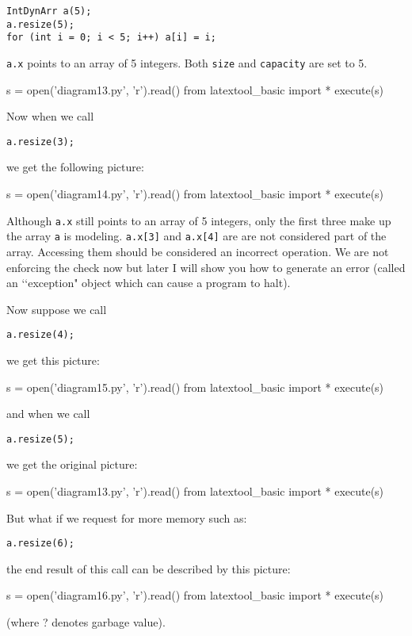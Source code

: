 \begin{Verbatim}[frame=single]
IntDynArr a(5);
a.resize(5);
for (int i = 0; i < 5; i++) a[i] = i;
\end{Verbatim}
\verb!a.x! points to an array of 5 integers.
Both \verb!size! and \verb!capacity! 
are set to 5.
\begin{python}
s = open('diagram13.py', 'r').read()
from latextool_basic import *
execute(s)
\end{python}

Now when we call
\begin{Verbatim}[frame=single]
a.resize(3);
\end{Verbatim}
we get the following picture:
\begin{python}
s = open('diagram14.py', 'r').read()
from latextool_basic import *
execute(s)
\end{python}

Although \verb!a.x! still points to an array of 5 integers, only 
the first three make up the array \verb!a! is modeling. \verb!a.x[3]!
and \verb!a.x[4]! are are not considered part of the array. Accessing 
them should be considered an incorrect operation. We are not enforcing 
the check now but later I will show you how to generate an error 
(called an \lq\lq exception" object which can cause a program to halt). 

Now suppose we call
\begin{Verbatim}[frame=single]
a.resize(4);
\end{Verbatim}
we get this picture:
\begin{python}
s = open('diagram15.py', 'r').read()
from latextool_basic import *
execute(s)
\end{python}
and when we call
\begin{Verbatim}[frame=single]
a.resize(5);
\end{Verbatim}
we get the original picture:
\begin{python}
s = open('diagram13.py', 'r').read()
from latextool_basic import *
execute(s)
\end{python}

But what if we request for more memory such as:
\begin{Verbatim}[frame=single]
a.resize(6);
\end{Verbatim}
the end result of this call can be described by this picture:
\begin{python}
s = open('diagram16.py', 'r').read()
from latextool_basic import *
execute(s)
\end{python}
(where ? denotes garbage value).

